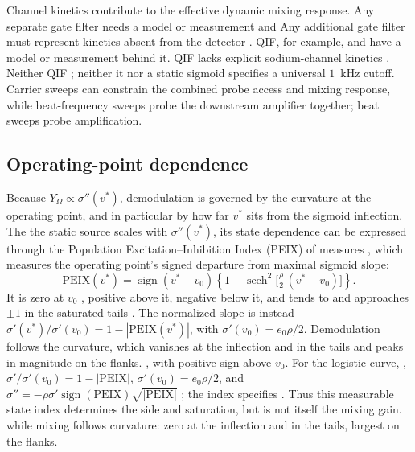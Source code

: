 \documentclass[11pt,a4paper]{article}
\newcommand{\Sig}{\sigma}
\providecommand{\DIFaddtex}[1]{{\protect\color{blue} \sf #1}} %
\providecommand{\DIFdeltex}[1]{{\protect\color{red} \scriptsize #1}} %
\providecommand{\DIFaddbegin}{} %
\providecommand{\DIFaddend}{} %
\providecommand{\DIFdelbegin}{} %
\providecommand{\DIFdelend}{} %
\providecommand{\DIFadd}[1]{\texorpdfstring{\DIFaddtex{#1}}{#1}} %
\providecommand{\DIFdel}[1]{\texorpdfstring{\DIFdeltex{#1}}{}} %
\begin{document}
\DIFdelbegin \DIFdel{Channel kinetics contribute to the effective dynamic mixing response. Any separate gate filter needs a model or measurement and }\DIFdelend \DIFaddbegin \DIFadd{Any additional gate filter }\DIFaddend must represent kinetics absent from the detector
\DIFdelbegin \DIFdel{. QIF, for example, }\DIFdelend \DIFaddbegin \DIFadd{and have a model or measurement behind it. QIF }\DIFaddend lacks explicit sodium-channel
kinetics\DIFdelbegin \DIFdel{. Neither QIF }\DIFdelend \DIFaddbegin \DIFadd{; neither it }\DIFaddend nor a static sigmoid specifies a universal $1$~kHz cutoff.
Carrier sweeps \DIFdelbegin \DIFdel{can constrain the
combined }\DIFdelend \DIFaddbegin \DIFadd{probe }\DIFaddend access and mixing \DIFdelbegin \DIFdel{response, while beat-frequency sweeps probe the
downstream amplifier}\DIFdelend \DIFaddbegin \DIFadd{together; beat sweeps probe amplification}\DIFaddend .

\subsection{Operating-point dependence}\label{sec:opp}
Because \DIFdelbegin \DIFdel{$Y_\Omega\propto\Sig''(v^*)$, demodulation is governed by the curvature at
the operating point, and in particular by how far $v^*$ sits from the sigmoid
inflection. The }\DIFdelend \DIFaddbegin \DIFadd{the static source scales with $\Sig''(v^*)$, its state dependence
can be expressed through the }\DIFaddend Population Excitation--Inhibition Index (PEIX)
\DIFdelbegin \DIFdel{of \cite{ruffini2025cfc}measures }\DIFdelend \DIFaddbegin \DIFadd{\cite{ruffini2025cfc}, which measures the operating point's }\DIFaddend signed departure from maximal sigmoid slope:
\begin{equation}
\mathrm{PEIX}(v^*)=\operatorname{sign}(v^*-v_0)
\left\{1-\operatorname{sech}^2\!\Big[\tfrac{\rho}{2}\,(v^*-v_0)\Big]\right\}.
\label{eq:peix}
\end{equation}
It is zero at $v_0$ \DIFdelbegin \DIFdel{, positive above it, negative below it, and tends to }\DIFdelend \DIFaddbegin \DIFadd{and approaches }\DIFaddend $\pm1$ in the saturated tails\DIFdelbegin \DIFdel{. The normalized slope is instead
$\Sig'(v^*)/\Sig'(v_0)=1-|\mathrm{PEIX}(v^*)|$, with
$\Sig'(v_0)=e_0\rho/2$. Demodulation follows the curvature, which vanishes at
the inflection and in the tails and peaks in magnitude on the flanks. }\DIFdelend \DIFaddbegin \DIFadd{, with
positive sign above $v_0$. }\DIFaddend For the logistic\DIFdelbegin \DIFdel{curve,
}\DIFdelend \DIFaddbegin \DIFadd{,
$\Sig'/\Sig'(v_0)=1-|\mathrm{PEIX}|$, $\Sig'(v_0)=e_0\rho/2$, and
}\DIFaddend $\Sig''=-\rho\Sig'\operatorname{sign}(\mathrm{PEIX})\sqrt{|\mathrm{PEIX}|}$\DIFdelbegin \DIFdel{;
the index specifies }\DIFdelend \DIFaddbegin \DIFadd{.
Thus this measurable state index determines }\DIFaddend the side and saturation, \DIFdelbegin \DIFdel{but is not itself the mixing gain.
}\DIFdelend \DIFaddbegin \DIFadd{while
mixing follows curvature: zero at the inflection and in the tails, largest
on the flanks.
}\DIFaddend
\end{document}
